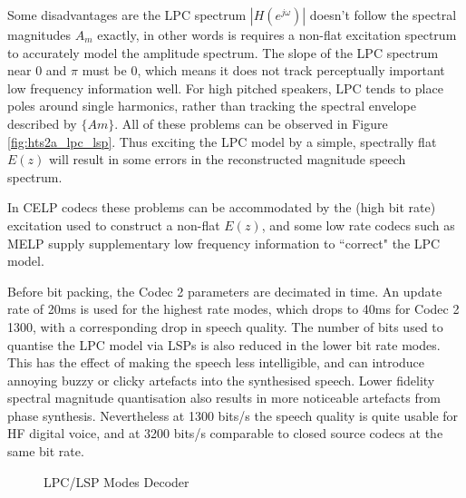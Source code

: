 \documentclass{article}
\begin{document}
{Some disadvantages \cite{makhoul1975linear} are the LPC spectrum $|H(e^{j \omega})|$ doesn't follow the spectral magnitudes $A_m$ exactly, in other words is requires a non-flat excitation spectrum to accurately model the amplitude spectrum. The slope of the LPC spectrum near 0 and $\pi$ must be 0, which means it does not track perceptually important low frequency information well. For high pitched speakers, LPC tends to place poles around single harmonics, rather than tracking the spectral envelope described by $\{Am\}$. All of these problems can be observed in Figure \ref{fig:hts2a_lpc_lsp}. Thus exciting the LPC model by a simple, spectrally flat $E(z)$ will result in some errors in the reconstructed magnitude speech spectrum.

In CELP codecs these problems can be accommodated by the (high bit rate) excitation used to construct a non-flat $E(z)$, and some low rate codecs such as MELP supply supplementary low frequency information to ``correct" the LPC model.

Before bit packing, the Codec 2 parameters are decimated in time.  An update rate of 20ms is used for the highest rate modes, which drops to 40ms for Codec 2 1300, with a corresponding drop in speech quality.  The number of bits used to quantise the LPC model via LSPs is also reduced in the lower bit rate modes.  This has the effect of making the speech less intelligible, and can introduce annoying buzzy or clicky artefacts into the synthesised speech.  Lower fidelity spectral magnitude quantisation also results in more noticeable artefacts from phase synthesis.  Nevertheless at 1300 bits/s the speech quality is quite usable for HF digital voice, and at 3200 bits/s comparable to closed source codecs at the same bit rate.

\begin{figure}[H]
\caption{LPC/LSP Modes Decoder}
\label{fig:decoder_lpc_lsp}
\begin{center}
\end{center}
\end{figure}}
\end{document}
